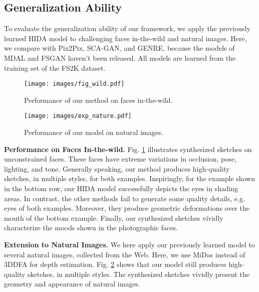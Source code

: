 \documentclass[10pt,twocolumn,letterpaper]{article}
\begin{document}
\subsection{Generalization Ability}
\label{ssec:exp_robust}
To evaluate the generalization ability of our framework, we apply the previously learned HIDA model to challenging faces in-the-wild and natural images. Here, we compare with Pix2Pix, SCA-GAN, and GENRE, because the models of MDAL and FSGAN haven't been released. All models are learned from the training set of the FS2K dataset.




\begin{figure}
	\centering
	\texttt{[image: images/fig\_wild.pdf]}
	\caption{Performance of our method on faces in-the-wild.}
	\label{fig:wild}
\end{figure}

\begin{figure}
	\texttt{[image: images/exp\_nature.pdf]}
	\caption{Performance of our model on natural images.}
	\label{fig:natural}
\end{figure}

\textbf{Performance on Faces In-the-wild.}
Fig. \ref{fig:wild} illustrates synthesized sketches on unconstrained faces. These faces have extreme variations in occlusion, pose, lighting, and tone. Generally speaking, our method produces high-quality sketches, in multiple styles, for both examples. Inspiringly, for the example shown in the bottom row, our HIDA model successfully depicts the eyes in shading areas. 
In contrast, the other methods fail to generate some quality details, e.g. eyes of both examples. Moreover, they produce geometric deformations over the mouth of the bottom example. 
Finally, our synthesized sketches vividly characterize the moods shown in the photographic faces. 


\textbf{Extension to Natural Images.}
We here apply our previously learned model to several natural images, collected from the Web. Here, we use MiDas \cite{ranftl2020MiDas} instead of 3DDFA for depth estimation. Fig. \ref{fig:natural} shows that our model still produces high-quality sketches, in multiple styles. The synthesized sketches vividly present the geometry and appearance of natural images. 
\end{document}
